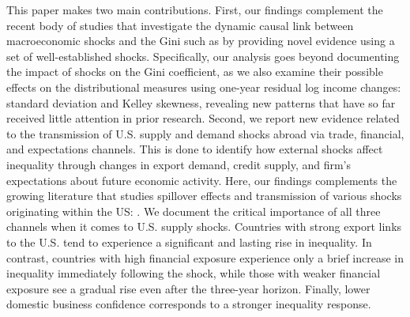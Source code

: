 \documentclass[12pt, a4paper]{article}
\begin{document}

This paper makes two main contributions. First, our findings complement the recent body of studies that investigate the dynamic causal link between macroeconomic shocks and the Gini such as \textcite{coibion2017innocent, Davtyan2017, furceri2018effects} by providing novel evidence using a set of well-established shocks. Specifically, our analysis goes beyond documenting the impact of shocks on the Gini coefficient, as we also examine their possible effects on the distributional measures using one-year residual log income changes: standard deviation and Kelley skewness, revealing new patterns that have so far received little attention in prior research. Second, we report new evidence related to the transmission of U.S. supply and demand shocks abroad via trade, financial, and expectations channels. This is done to identify how external shocks affect inequality through changes in export demand, credit supply, and firm's expectations about future economic activity. Here, our findings complements the growing literature that studies spillover effects and transmission of various shocks originating within the US: \textcite{canova2005transmission, mackowiak2007external, akinci2013global, bowman2015us, dedola2017if, carrillo2020inquiry, levchenko2020tfp, di2022international, azad2022spillovers, lastauskas2023global, lastaukas2024}. We document the critical importance of all three channels when it comes to U.S. supply shocks. Countries with strong export links to the U.S. tend to experience a significant and lasting rise in inequality. In contrast, countries with high financial exposure experience only a brief increase in inequality immediately following the shock, while those with weaker financial exposure see a gradual rise even after the three-year horizon. Finally, lower domestic business confidence corresponds to a stronger inequality response.

\end{document}
